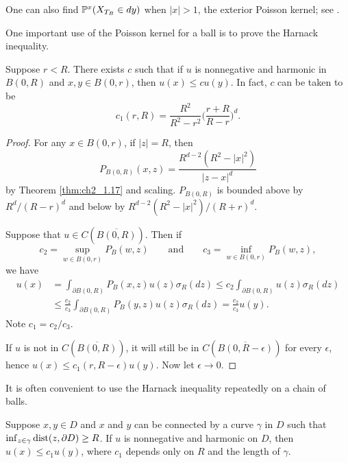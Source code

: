 
\mpagebreak

One can also find $\P^x(X_{T_B} \in dy)$ when $|x| > 1$, the exterior Poisson kernel; see \cite{PortStone1978}.


One important use of the Poisson kernel for a ball is to prove the Harnack inequality.

\begin{theorem}\label{thm:ch2_1.19}
Suppose $r < R$. There exists $c$ such that if $u$ is nonnegative and harmonic in $B(0,R)$ and $x,y \in B(0,r)$, then $u(x) \leq cu(y)$. In fact, $c$ can be taken to be
\[
    c_1(r,R) = \frac{R^2}{R^2-r^2}\Big(\frac{r+R}{R-r}\Big)^d.
\]
\end{theorem}

\begin{proof}
For any $x \in B(0,r)$, if $|z| = R$, then
\[
    P_{B(0,R)}(x,z) = \frac{R^{d-2}(R^2-|x|^2)}{|z-x|^d}
\]
by Theorem \ref{thm:ch2_1.17} and scaling. $P_{B(0,R)}$ is bounded above by $R^d/(R-r)^d$ and below by $R^{d-2}(R^2-|x|^2)/(R+r)^d$.

Suppose that $u \in C(\overline{B(0,R)})$. Then if
\[
    c_2 = \sup_{w\in B(0,r)} P_B(w,z) \qquad\text{and}\qquad c_3 = \inf_{w\in B(0,r)} P_B(w,z),
\]
we have
\begin{align*}
    u(x)& = \int_{\partial B(0,R)} P_B(x,z)u(z)\sigma_R(dz) \leq c_2 \int_{\partial B(0,R)} u(z)\sigma_R(dz) \\
    &\leq \frac{c_2}{c_3} \int_{\partial B(0,R)} P_B(y,z)u(z)\sigma_R(dz) = \frac{c_2}{c_3}u(y).
\end{align*}
Note $c_1 = c_2/c_3$.

If $u$ is not in $C(\overline{B(0,R)})$, it will still be in $C(\overline{B(0,R-\epsilon)})$ for every $\epsilon$, hence $u(x) \leq c_1(r,R-\epsilon)u(y)$. Now let $\epsilon \to 0$.
\end{proof}

It is often convenient to use the Harnack inequality repeatedly on a chain of balls.

\begin{theorem}\label{thm:ch2_1.20}
Suppose $x,y \in D$ and $x$ and $y$ can be connected by a curve $\gamma$ in $D$ such that $\inf_{z\in\gamma} \dist(z,\partial D) \geq R$. If $u$ is nonnegative and harmonic on $D$, then $u(x) \leq c_1u(y)$, where $c_1$ depends only on $R$ and the length of $\gamma$.
\end{theorem}

